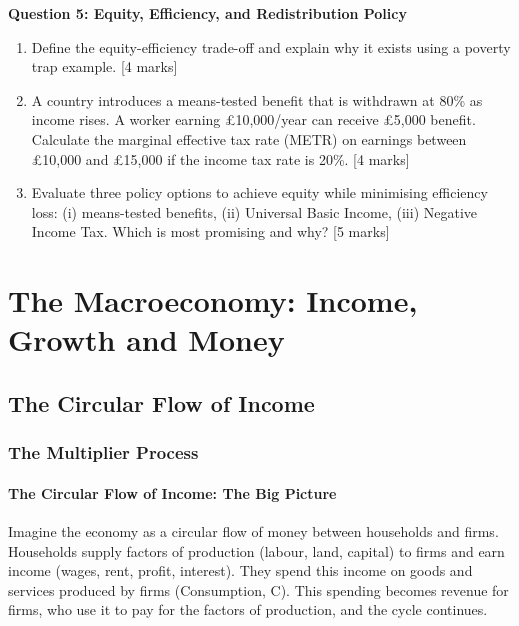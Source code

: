 \documentclass[11pt, a4paper, twoside]{book}
\begin{document}
\begin{exampractice}
\textbf{Question 5: Equity, Efficiency, and Redistribution Policy}

\begin{enumerate}[label=(\alph*)]
\item Define the equity-efficiency trade-off and explain why it exists using a poverty trap example. [4 marks]
\item A country introduces a means-tested benefit that is withdrawn at 80\% as income rises. A worker earning £10,000/year can receive £5,000 benefit. Calculate the marginal effective tax rate (METR) on earnings between £10,000 and £15,000 if the income tax rate is 20\%. [4 marks]
\item Evaluate three policy options to achieve equity while minimising efficiency loss: (i) means-tested benefits, (ii) Universal Basic Income, (iii) Negative Income Tax. Which is most promising and why? [5 marks]
\end{enumerate}
\end{exampractice}

\chapter{The Macroeconomy: Income, Growth and Money}

\section{The Circular Flow of Income}

\subsection{The Multiplier Process}

\subsubsection{The Circular Flow of Income: The Big Picture}

Imagine the economy as a circular flow of money between households and firms. Households supply factors of production (labour, land, capital) to firms and earn income (wages, rent, profit, interest). They spend this income on goods and services produced by firms (Consumption, C). This spending becomes revenue for firms, who use it to pay for the factors of production, and the cycle continues.
\end{document}
